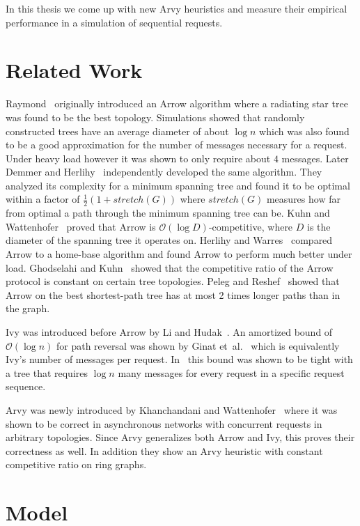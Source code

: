 \documentclass[a4paper, oneside]{discothesis}
\begin{document}
In this thesis we come up with new Arvy heuristics and measure their empirical performance in a simulation of sequential requests.

\section{Related Work}

Raymond~\cite{Ray} originally introduced an Arrow algorithm where a radiating star tree was found to be the best topology. Simulations showed that randomly constructed trees have an average diameter of about $\log n$ which was also found to be a good approximation for the number of messages necessary for a request. Under heavy load however it was shown to only require about $4$ messages. Later Demmer and Herlihy~\cite{Arrow} independently developed the same algorithm. They analyzed its complexity for a minimum spanning tree and found it to be optimal within a factor of $\frac{1}{2}(1+stretch(G))$ where $stretch(G)$ measures how far from optimal a path through the minimum spanning tree can be. Kuhn and Wattenhofer~\cite{Kuhn} proved that Arrow is $\mathcal{O}(\log D)$-competitive, where $D$ is the diameter of the spanning tree it operates on. Herlihy and Warres~\cite{Tale} compared Arrow to a home-base algorithm and found Arrow to perform much better under load. Ghodselahi and Kuhn~\cite{Ghod} showed that the competitive ratio of the Arrow protocol is constant on certain tree topologies. Peleg and Reshef~\cite{Peleg} showed that Arrow on the best shortest-path tree has at most 2 times longer paths than in the graph.

Ivy was introduced before Arrow by Li and Hudak~\cite{Ivy}. An amortized bound of $\mathcal{O}(\log n)$ for path reversal was shown by Ginat et~al.~\cite{Ginat} which is equivalently Ivy's number of messages per request. In~\cite{Distr} this bound was shown to be tight with a tree that requires $\log n$ many messages for every request in a specific request sequence.

Arvy was newly introduced by Khanchandani and Wattenhofer~\cite{Arvy} where it was shown to be correct in asynchronous networks with concurrent requests in arbitrary topologies. Since Arvy generalizes both Arrow and Ivy, this proves their correctness as well. In addition they show an Arvy heuristic with constant competitive ratio on ring graphs.

\section{Model}\label{model}
\end{document}
